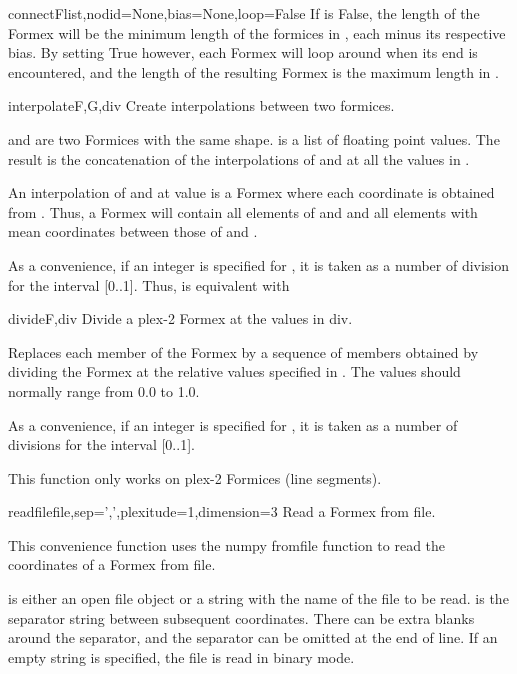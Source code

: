 {{\begin{funcdesc}{connect}{Flist,nodid=None,bias=None,loop=False}
If  is False, the length of the Formex will be the minimum length of the formices in , each minus its respective bias. By setting  True however, each Formex will loop around when its end is encountered, and the length of the resulting Formex is the maximum length in .
\end{funcdesc}


\begin{funcdesc}{interpolate}{F,G,div}
Create interpolations between two formices.

 and  are two Formices with the same shape.
 is a list of floating point values.
The result is the concatenation of the interpolations of  and  at all the values in .

An interpolation of  and  at value  is a Formex  where each coordinate  is obtained from  .
Thus, a Formex  will contain all elements
of  and  and all elements with mean coordinates between those of  and .

As a convenience, if an integer is specified for , it is taken as a
number of division for the interval [0..1].
Thus,  is equivalent with
\end{funcdesc}


\begin{funcdesc}{divide}{F,div}
Divide a plex-2 Formex at the values in div.

Replaces each member of the Formex  by a sequence of members obtained
by dividing the Formex at the relative values specified in . The values
should normally range from 0.0 to 1.0.
    
As a convenience, if an integer is specified for , it is taken as a
number of divisions for the interval [0..1].

This function only works on plex-2 Formices (line segments).
\end{funcdesc}


\begin{funcdesc}{readfile}{file,sep=',',plexitude=1,dimension=3}
Read a Formex from file.

This convenience function uses the numpy fromfile function to read the coordinates of a Formex from file. 

 is either an open file object or a string with the name of the file to be read.
 is the separator string between subsequent coordinates. There can be extra blanks around the separator, and the separator can be omitted at the end of line. If an empty string is specified, the file is read in binary mode.


\end{funcdesc}}}
